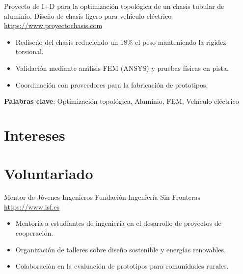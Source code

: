 \documentclass[a4paper, serif, 10pt]{moderncv}
\begin{document}
        {Proyecto de I+D para la optimización topológica de un chasis tubular de aluminio.}
        {Diseño de chasis ligero para vehículo eléctrico}
        {\url{https://www.proyectochasis.com}}
        {}
        {\begin{itemize}
\item Rediseño del chasis reduciendo un 18\% el peso manteniendo la rigidez torsional.
\item Validación mediante análisis FEM (ANSYS) y pruebas físicas en pista.
\item Coordinación con proveedores para la fabricación de prototipos.
\end{itemize}
\textbf{Palabras clave}: Optimización topológica, Aluminio, FEM, Vehículo eléctrico}
\section{Intereses}

\section{Voluntariado}

        {Mentor de Jóvenes Ingenieros}
        {Fundación Ingeniería Sin Fronteras}
        {\url{https://www.isf.es}}
        {}
        {\begin{itemize}
\item Mentoría a estudiantes de ingeniería en el desarrollo de proyectos de cooperación.
\item Organización de talleres sobre diseño sostenible y energías renovables.
\item Colaboración en la evaluación de prototipos para comunidades rurales.
\end{itemize}}
    
\end{document}
